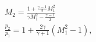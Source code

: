 \documentclass[10pt]{article}
\begin{document}
\begin{align*}& M_{2}
=
\frac{
1+\frac{\gamma-1}{2} M_{1}^{2}
}
{
\gamma M_{1}^{2} - \frac{\gamma-1}{2}
}
\\
& \frac{p_2}{p_1}
=
1+ \frac{2 \gamma}{\gamma+1} \left( M_{1}^{2} - 1 \right), \end{align*}
\end{document}

